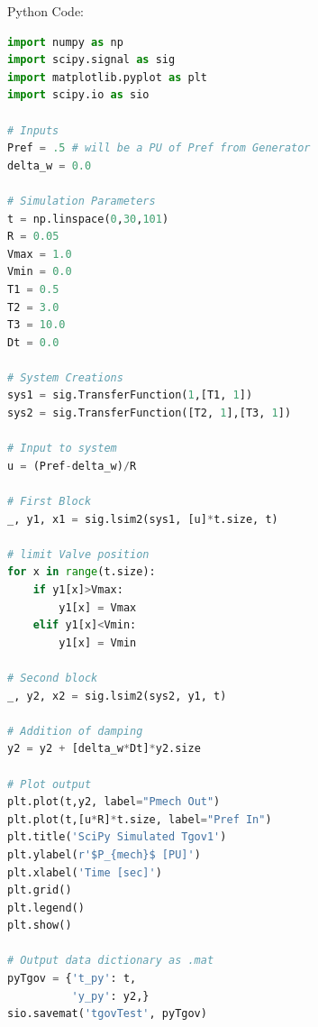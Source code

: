 \documentclass[12pt]{article}
\begin{document}
Python Code:
\begin{lstlisting}[language=Python]
import numpy as np
import scipy.signal as sig
import matplotlib.pyplot as plt
import scipy.io as sio

# Inputs
Pref = .5 # will be a PU of Pref from Generator
delta_w = 0.0

# Simulation Parameters
t = np.linspace(0,30,101)
R = 0.05
Vmax = 1.0
Vmin = 0.0
T1 = 0.5
T2 = 3.0
T3 = 10.0
Dt = 0.0

# System Creations
sys1 = sig.TransferFunction(1,[T1, 1])
sys2 = sig.TransferFunction([T2, 1],[T3, 1])

# Input to system
u = (Pref-delta_w)/R

# First Block
_, y1, x1 = sig.lsim2(sys1, [u]*t.size, t)

# limit Valve position
for x in range(t.size):
    if y1[x]>Vmax:
        y1[x] = Vmax
    elif y1[x]<Vmin:
        y1[x] = Vmin

# Second block
_, y2, x2 = sig.lsim2(sys2, y1, t)

# Addition of damping
y2 = y2 + [delta_w*Dt]*y2.size

# Plot output
plt.plot(t,y2, label="Pmech Out")
plt.plot(t,[u*R]*t.size, label="Pref In")
plt.title('SciPy Simulated Tgov1')
plt.ylabel(r'$P_{mech}$ [PU]')
plt.xlabel('Time [sec]')
plt.grid()
plt.legend()
plt.show()

# Output data dictionary as .mat
pyTgov = {'t_py': t,
          'y_py': y2,}
sio.savemat('tgovTest', pyTgov)
\end{lstlisting}

\end{document}
